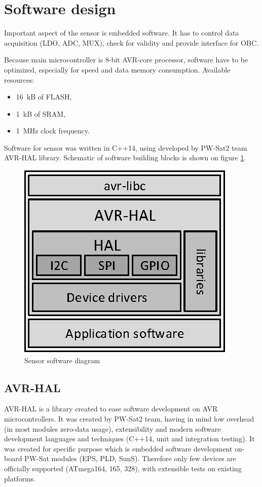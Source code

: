 \section{Software design}
    Important aspect of the sensor is embedded software. It has to control data acquisition (LDO, ADC, MUX), check for validity and provide \iic interface for OBC.

    Because main microcontroller is 8-bit AVR-core processor, software have to be optimized, especially for speed and data memory consumption. Available resources:
    \begin{itemize}
        \item \SI{16}{\kilo B} of FLASH,
        \item \SI{1}{\kilo B} of SRAM,
        \item \SI{1}{\mega\hertz} clock frequency.
    \end{itemize}

    Software for sensor was written in C++14, using developed by PW-Sat2 team AVR-HAL library. Schematic of software building blocks is shown on figure \ref{Sensor_software_diagram}.

    \begin{figure}[H]
        \centering
        \includegraphics[width=0.5\paperwidth]{img/06/software_diagram.eps}
        \caption{Sensor software diagram}
        \label{Sensor_software_diagram}
    \end{figure}

    \subsection{AVR-HAL}
    AVR-HAL is a library created to ease software development on AVR microcontrollers. It was created by PW-Sat2 team, having in mind low overhead (in most modules zero-data usage), extensibility and modern software development languages and techniques (C++14, unit and integration testing). It was created for specific purpose which is embedded software development on-board PW-Sat modules (EPS, PLD, SunS). Therefore only few devices are officially supported (ATmega164, 165, 328), with extensible tests on existing platforms.

